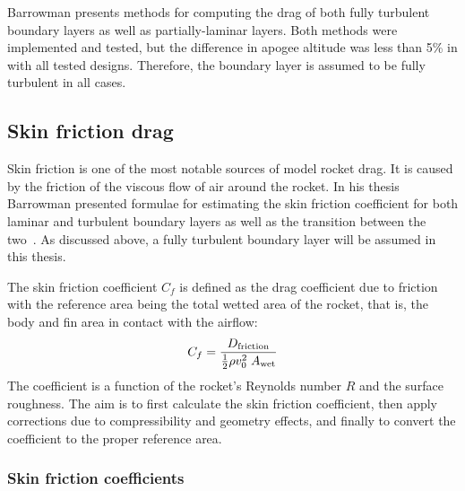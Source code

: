 Barrowman presents methods for computing the drag of both fully
turbulent boundary layers as well as partially-laminar layers.  Both
methods were implemented and tested, but the difference in apogee
altitude was less than 5\% in with all tested designs.  Therefore,
the boundary layer is assumed to be fully turbulent in all cases.







\subsection{Skin friction drag}

Skin friction is one of the most notable sources of model rocket
drag.  It is caused by the friction of the viscous flow of air
around the rocket.  In his thesis Barrowman presented formulae for
estimating the skin friction coefficient for both laminar and
turbulent boundary layers as well as the transition between the
two~\cite[pp.~43--47]{barrowman-thesis}.  As discussed above, a fully
turbulent boundary layer will be assumed in this thesis.

The skin friction coefficient $C_f$ is defined as the drag coefficient
due to friction with the reference area being the total wetted area
of the rocket, that is, the body and fin area in contact with the
airflow:
%
\begin{equation}
C_f = \frac{D_{\rm friction}}{\frac{1}{2} \rho v_0^2\;A_{\rm wet}}
\end{equation}
%
The coefficient is a function of the rocket's Reynolds number $R$ and
the surface roughness.  The aim is to first calculate the skin
friction coefficient, then apply corrections due to compressibility
and geometry effects, and finally to convert the coefficient to the
proper reference area.


\subsubsection{Skin friction coefficients}
\label{sec-skin-friction-coefficient}

